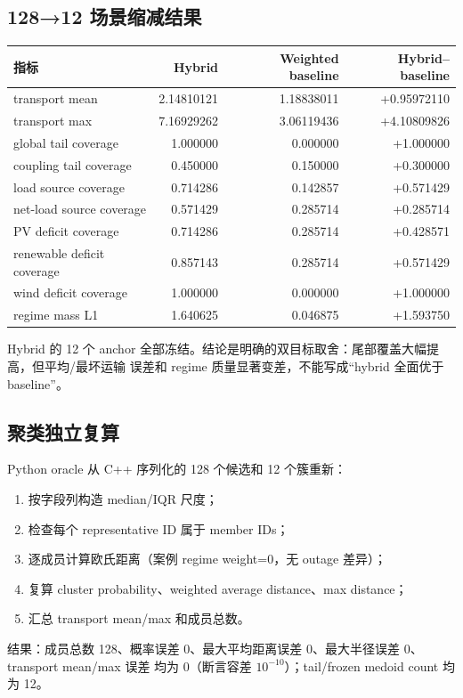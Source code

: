 \subsection{128→12 场景缩减结果}
\begin{center}\small
\begin{tabular}{@{}L{5.5cm}rrr@{}}
\toprule
指标 & Hybrid & Weighted baseline & Hybrid--baseline\\
\midrule
transport mean & 2.14810121 & 1.18838011 & +0.95972110\\
transport max & 7.16929262 & 3.06119436 & +4.10809826\\
global tail coverage & 1.000000 & 0.000000 & +1.000000\\
coupling tail coverage & 0.450000 & 0.150000 & +0.300000\\
load source coverage & 0.714286 & 0.142857 & +0.571429\\
net-load source coverage & 0.571429 & 0.285714 & +0.285714\\
PV deficit coverage & 0.714286 & 0.285714 & +0.428571\\
renewable deficit coverage & 0.857143 & 0.285714 & +0.571429\\
wind deficit coverage & 1.000000 & 0.000000 & +1.000000\\
regime mass L1 & 1.640625 & 0.046875 & +1.593750\\
\bottomrule
\end{tabular}
\end{center}
Hybrid 的 12 个 anchor 全部冻结。结论是明确的双目标取舍：尾部覆盖大幅提高，但平均/最坏运输
误差和 regime 质量显著变差，不能写成“hybrid 全面优于 baseline”。

\subsection{聚类独立复算}
Python oracle 从 C++ 序列化的 128 个候选和 12 个簇重新：
\begin{enumerate}
  \item 按字段列构造 median/IQR 尺度；
  \item 检查每个 representative ID 属于 member IDs；
  \item 逐成员计算欧氏距离（案例 regime weight=0，无 outage 差异）；
  \item 复算 cluster probability、weighted average distance、max distance；
  \item 汇总 transport mean/max 和成员总数。
\end{enumerate}
结果：成员总数 128、概率误差 0、最大平均距离误差 0、最大半径误差 0、transport mean/max 误差
均为 0（断言容差 $10^{-10}$）；tail/frozen medoid count 均为 12。

